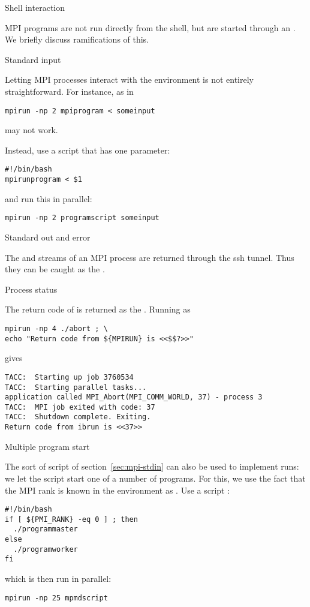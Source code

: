  {Shell interaction}

MPI programs are not run directly from the shell, but are started
through an . We briefly discuss
ramifications of this.

 {Standard input}
\label{sec:mpi-stdin}

Letting MPI processes interact with the environment is not entirely
straightforward.
For instance,
%
as in
\begin{verbatim}
mpirun -np 2 mpiprogram < someinput
\end{verbatim}
may not work.

Instead, use a script  that has one parameter:
\begin{verbatim}
#!/bin/bash
mpirunprogram < $1
\end{verbatim}
and run this in parallel:
\begin{verbatim}
mpirun -np 2 programscript someinput
\end{verbatim}

 {Standard out and error}

The  and  streams of an MPI
process are returned through the ssh tunnel. Thus they can be caught
as the .


 {Process status}

The return code of  is returned as the
.
Running
as
\begin{verbatim}
mpirun -np 4 ./abort ; \
echo "Return code from ${MPIRUN} is <<$$?>>"
\end{verbatim}
gives
\begin{verbatim}
TACC:  Starting up job 3760534
TACC:  Starting parallel tasks...
application called MPI_Abort(MPI_COMM_WORLD, 37) - process 3
TACC:  MPI job exited with code: 37
TACC:  Shutdown complete. Exiting.
Return code from ibrun is <<37>>
\end{verbatim}

 {Multiple program start}
\label{sec:mpmd-start}

The sort of script of section~\ref{sec:mpi-stdin}
can also be used to implement  runs:
we let the script start one of a number of programs. For this, we use
the fact that the MPI rank is known in the environment as
. Use a script :
\begin{verbatim}
#!/bin/bash
if [ ${PMI_RANK} -eq 0 ] ; then
  ./programmaster
else
  ./programworker
fi
\end{verbatim}
which is then run in parallel:
\begin{verbatim}
mpirun -np 25 mpmdscript
\end{verbatim}

